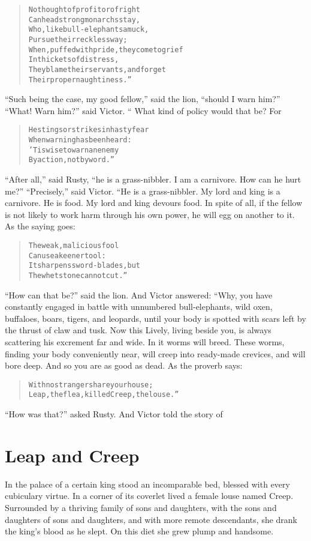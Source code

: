 \documentclass[article, twoside, 14pt]{memoir}
\renewenvironment{verbatim}{%
\begin{quote}%
\vskip -10pt%
\begin{alltt}\normalfont\large}{\end{alltt}%
\end{quote}%
\vskip -10pt
} %
\begin{document}
\begin{verbatim}
No thought of profit or of right
    Can headstrong monarchs stay,
Who, like bull-elephants amuck,
    Pursue their reckless way;
When, puffed with pride, they come to grief
    In thickets of distress,
They blame their servants, and forget
    Their proper naughtiness.”
\end{verbatim}
``Such being the case, my good fellow,'' said the lion,
``should I warn him?'' ``What! Warn him?'' said Victor. “ What kind
of policy would that be? For

\begin{verbatim}
He stings or strikes in hasty fear
    When warning has been heard:
'Tis wise to warn an enemy
    By action, not by word.”
\end{verbatim}
``After all,'' said Rusty,
``he is a grass-nibbler. I am a carnivore. How can he hurt me?''
``Precisely,'' said Victor. “He is a grass-nibbler. My lord and
king is a carnivore. He is food. My lord and king devours food. In
spite of all, if the fellow is not likely to work harm through his
own power, he will egg on another to it. As the saying goes:

\begin{verbatim}
The weak, malicious fool
Can use a keener tool:
It sharpens sword-blades, but
The whetstone cannot cut.”
\end{verbatim}
``How can that be?'' said the lion. And Victor answered:
“Why, you have constantly engaged in battle with unnumbered
bull-elephants, wild oxen, buffaloes, boars, tigers, and leopards,
until your body is spotted with scars left by the thrust of claw
and tusk. Now this Lively, living beside you, is always scattering
his excrement far and wide. In it worms will breed. These worms,
finding your body conveniently near, will creep into ready-made
crevices, and will bore deep. And so you are as good as dead. As
the proverb says:

\begin{verbatim}
With no stranger share your house;
Leap, the flea, killed Creep, the louse.”
\end{verbatim}
``How was that?'' asked Rusty. And Victor told the story of

\chapter{Leap and Creep}

\label{s13}

In the palace of a certain king stood an incomparable bed, blessed
with every cubiculary virtue. In a corner of its coverlet lived a
female louse named Creep. Surrounded by a thriving family of sons
and daughters, with the sons and daughters of sons and daughters,
and with more remote descendants, she drank the king's blood as he
slept. On this diet she grew plump and handsome.
\end{document}
